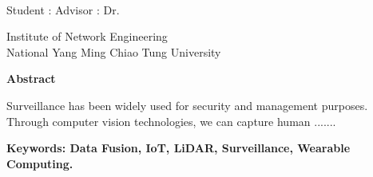  \begin{center}
  	\large
  	\begin{singlespace}
  		\textbf{\englishTitle{}} \\[0.5cm]
  	\end{singlespace}
  	
  	\begin{singlespace}

  			Student : \studentEnName{}  \hspace{1.0cm} Advisor  : Dr.\, \advisorEnName \\
  			[0.5cm]

  	\end{singlespace}
  	
  	\begin{singlespace}
  		Institute of Network Engineering\\ National Yang Ming Chiao Tung University\\[0.5cm]
  	\end{singlespace}
  	\textbf{Abstract} \\[0.5cm]
  	
  \end{center}
  \normalsize 
  
Surveillance has been widely used for security and management purposes. Through computer vision technologies, we can capture human .......


\vspace{1cm}

\textbf{Keywords: Data Fusion, IoT, LiDAR, Surveillance, Wearable Computing.} 
  

